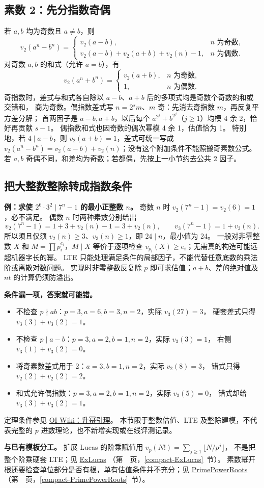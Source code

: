\subsection{素数 2：先分指数奇偶}
若 $a,b$ 均为奇数且 $a\ne b$，则
\[
v_2(a^n-b^n)=
\begin{cases}
v_2(a-b),&n\text{ 为奇数},\\
v_2(a-b)+v_2(a+b)+v_2(n)-1,&n\text{ 为偶数}.
\end{cases}
\]
对奇数 $a,b$ 的和式（允许 $a=b$），有
\[
v_2(a^n+b^n)=
\begin{cases}
v_2(a+b),&n\text{ 为奇数},\\
1,&n\text{ 为偶数}.
\end{cases}
\]
奇指数时，差式与和式各自除以 $a-b$、$a+b$ 后的多项式均是奇数个奇数的和或交错和，
商为奇数。偶指数差式写 $n=2^sm$、$m$ 奇：先消去奇指数 $m$，再反复平方差分解；
首两因子是 $a-b,a+b$，以后每个 $a^{2^j}+b^{2^j}$（$j\ge1$）均模 4 余 2，恰好再贡献 $s-1$。
偶指数和式也因奇数的偶次幂模 4 余 1，估值恰为 1。
特别地，若 $4\mid a-b$，则 $v_2(a+b)=1$，差式可统一写成
$v_2(a^n-b^n)=v_2(a-b)+v_2(n)$；没有这个附加条件不能照搬奇素数公式。
若 $a,b$ 奇偶不同，和差均为奇数；若都偶，先按上一小节约去公共 2 因子。

\subsection{把大整数整除转成指数条件}
\textbf{例：求使 $2^6\cdot3^2\mid7^n-1$ 的最小正整数 $n$。}
奇数 $n$ 时 $v_2(7^n-1)=v_2(6)=1$，必不满足。
偶数 $n$ 时两种素数分别给出
\[
v_2(7^n-1)=1+3+v_2(n)-1=3+v_2(n),\qquad
v_3(7^n-1)=1+v_3(n).
\]
所以须且仅须 $v_2(n)\ge3$、$v_3(n)\ge1$，即 $24\mid n$，最小值为 24。
一般对非零整数 $X$ 和 $M=\prod p_i^{e_i}$，$M\mid X$ 等价于逐项检查
$v_{p_i}(X)\ge e_i$；无需真的构造可能远超机器字长的幂。
LTE 只能处理满足条件的局部因子，不能代替任意底数的乘法阶或离散对数问题。
实现时非零整数反复除 $p$ 即可求估值；$a+b$、差的绝对值及 $nt$ 的计算仍须防溢出。

\Needspace{120pt}
\textbf{条件漏一项，答案就可能错。}
\begin{itemize}
\item 不检查 $p\nmid ab$：$p=3,a=6,b=3,n=2$，实际 $v_3(27)=3$，
      硬套差式只得 $v_3(3)+v_3(2)=1$。
\item 不检查 $p\mid a-b$：$p=3,a=2,b=1,n=2$，实际 $v_3(3)=1$，
      右侧 $v_3(1)+v_3(2)=0$。
\item 将奇素数差式用于 2：$a=3,b=1,n=2$，实际 $v_2(8)=3$，
      错式只得 $v_2(2)+v_2(2)=2$。
\item 和式允许偶指数：$p=3,a=2,b=1,n=2$，实际 $v_3(5)=0$，
      错式却给 $v_3(3)+v_3(2)=1$。
\end{itemize}
定理条件参见
\href{https://oi-wiki.org/math/number-theory/lift-the-exponent/}{OI Wiki：升幂引理}。
本节限于整数估值、LTE 及整除建模，不代表完整的 $p$ 进数理论，也不新增实现或在线评测记录。

\textbf{与已有模板分工。}
扩展 Lucas 的阶乘赋值用 $v_p(N!)=\sum_{j\ge1}\lfloor N/p^j\rfloor$，
不是把整个阶乘硬套 LTE；见 \hyperref[compact-ExLucas]{ExLucas}
（第~\pageref{compact-ExLucas}~页，\ref{compact-ExLucas}~节）。
素数幂开根还要检查单位部分是否有根，单有估值条件并不充分；见
\hyperref[compact-PrimePowerRoots]{PrimePowerRoots}
（第~\pageref{compact-PrimePowerRoots}~页，\ref{compact-PrimePowerRoots}~节）。
